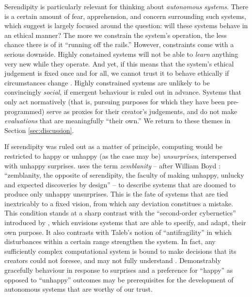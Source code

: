 Serendipity is particularly relevant for thinking about
\emph{autonomous systems}.  There is a certain amount of fear,
apprehension, and concern surrounding such systems, which
 suggest is largely focused around the
question: will these systems behave in an ethical manner?  The more we
constrain the system's operation, the less chance there is of it
``running off the rails.''  However, constraints come with a serious
downside.  Highly constained systems will not be able to \emph{learn}
anything very new while they operate.  And yet, if this means that the
system's ethical judgement is fixed once and for all, we cannot trust
it to behave ethically if circumstances change
\cite{powers2005deontological}.  Highly constrained systems are
unlikely to be convincingly \emph{social}, if emergent behaviour is
ruled out in advance.  Systems that only act normatively (that is,
pursuing purposes for which they have been pre-programmed) serve as
proxies for their creator's judgements, and do not make
\emph{evaluations} that are meaningfully ``their own.''  We return to these themes in Section \ref{sec:discussion}.

If serendipity was ruled out as a matter of principle, computing would
be restricted to happy or unhappy (as the case may be)
\emph{unsurprises}, interspersed with unhappy surprises.
 uses the term \emph{zemblanity} -- after
William Boyd \citeyearpar{boyd2010armadillo}: ``zemblanity, the
opposite of serendipity, the faculty of making unhappy, unlucky and
expected discoveries by design'' -- to describe systems that are
doomed to produce only unhappy unsurprises.  This is the fate of
systems that are tied inextricably to a fixed vision, from which any
deviation constitues a mistake.  This condition stands at a sharp
contrast with the ``second-order cybernetics'' introduced by
, which envisions systems that are able to
specify, and adapt, their own purpose.  It also contrasts with Taleb's
\citeyearpar{taleb2012antifragile} notion of ``antifragility'' in
which disturbances within a certain range strengthen the system.  In
fact, any sufficiently complex computational system is bound to make
decisions that its creators could not foresee, and may not fully
understand \cite{minsky1967programming}.  Demonstrably gracefully
behaviour in response to surprises and a preference for ``happy'' as
opposed to ``unhappy'' outcomes may be prerequisites for the
development of autonomous systems that are worthy of our trust.

